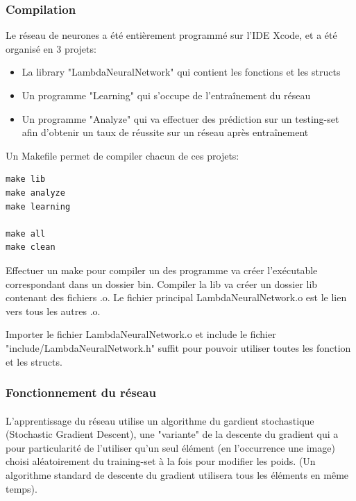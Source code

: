 \documentclass{article}
\begin{document}
\newpage

\subsubsection{Compilation}
Le réseau de neurones a été entièrement programmé sur l'IDE Xcode, et a été organisé en 3 projets:


\begin{itemize}
	\item La library "LambdaNeuralNetwork" qui contient les fonctions et les structs
	\item Un programme "Learning" qui s'occupe de l'entraînement du réseau
	\item Un programme "Analyze" qui va effectuer des prédiction sur un testing-set afin d'obtenir un taux de réussite sur un réseau après entraînement
\end{itemize}
Un Makefile permet de compiler chacun de ces projets:

\begin{lstlisting}
make lib
make analyze
make learning

make all
make clean
\end{lstlisting}

Effectuer un make pour compiler un des programme va créer l'exécutable correspondant dans un dossier bin.
Compiler la lib va créer un dossier lib contenant des fichiers .o. Le fichier principal LambdaNeuralNetwork.o est le lien vers tous les autres .o.

Importer le fichier LambdaNeuralNetwork.o et include le fichier "include/LambdaNeuralNetwork.h" suffit pour pouvoir utiliser toutes les fonction et les structs.


\subsubsection{Fonctionnement du réseau}

\paragraph{}L'apprentissage du réseau utilise un algorithme du gardient stochastique (Stochastic Gradient Descent), une "variante" de la descente du gradient qui a pour particularité de l'utiliser qu'un seul élément (en l'occurrence une image) choisi aléatoirement du training-set à la fois pour modifier les poids. (Un algorithme standard de descente du gradient utilisera tous les éléments en même temps).
\end{document}
